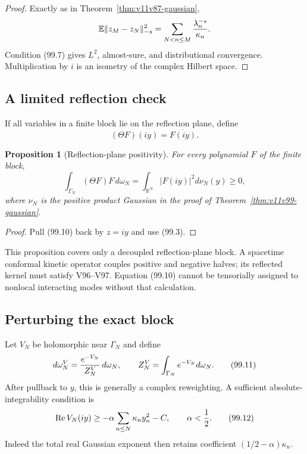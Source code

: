 \documentclass[11pt]{article}
\newtheorem{proposition}[theorem]{Proposition}
\begin{document}
\begin{proof}
Exactly as in Theorem~\ref{thm:v11v87-gaussian},
\[
 \mathbb E\|z_M-z_N\|_{-s}^2
 =\sum_{N<n\le M}{\lambda_n^{-s}\over\kappa_n}.
\]
Condition (99.7) gives \(L^2\), almost-sure, and distributional
convergence.  Multiplication by \(i\) is an isometry of the complex
Hilbert space.
\end{proof}

\subsection{A limited reflection check}

If all variables in a finite block lie on the reflection plane, define
\[
                              (\Theta F)(iy)=\overline{F(iy)}. \tag{99.9}
\]

\begin{proposition}[Reflection-plane positivity]
\label{prop:v11v99-plane}
For every polynomial \(F\) of the finite block,
\[
                         \int_{\Gamma_N}(\Theta F)F\,d\omega_N
                         =\int_{\mathbb R^N}|F(iy)|^2d\nu_N(y)
                         \ge0,                              \tag{99.10}
\]
where \(\nu_N\) is the positive product Gaussian in the proof of
Theorem~\ref{thm:v11v99-gaussian}.
\end{proposition}

\begin{proof}
Pull (99.10) back by \(z=iy\) and use (99.3).
\end{proof}

This proposition covers only a decoupled reflection-plane block.
A spacetime conformal kinetic operator couples positive and negative
halves; its reflected kernel must satisfy V96--V97.  Equation (99.10)
cannot be tensorially assigned to nonlocal interacting modes without
that calculation.

\subsection{Perturbing the exact block}

Let \(V_N\) be holomorphic near \(\Gamma_N\) and define
\[
                              d\omega_N^V
                 ={e^{-V_N}\over Z_N^V}\,d\omega_N,\qquad
 Z_N^V=\int_{\Gamma_N}e^{-V_N}d\omega_N.                    \tag{99.11}
\]
After pullback to \(y\), this is generally a complex reweighting.
A sufficient absolute-integrability condition is
\[
                         \operatorname{Re}V_N(iy)
                         \ge-\alpha\sum_{n\le N}\kappa_ny_n^2-C,
                    \qquad \alpha<{1\over2}.                \tag{99.12}
\]
Indeed the total real Gaussian exponent then retains coefficient
\((1/2-\alpha)\kappa_n\).
\end{document}

